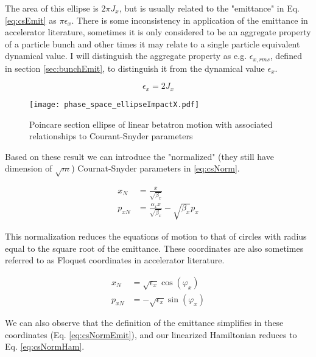 The area of this ellipse is $2\pi J_x$, but is usually related to the "emittance" in Eq. \ref{eq:csEmit} as $\pi \epsilon_x$. There is some inconsistency in application of the emittance in accelerator literature, sometimes it is only considered to be an aggregate property of a particle bunch and other times it may relate to a single particle equivalent dynamical value. I will distinguish the aggregate property as e.g. $\epsilon_{x,rms}$, defined in section \ref{sec:bunchEmit}, to distinguish it from the dynamical value $\epsilon_x$.

\begin{equation} \label{eq:csEmit}
	\epsilon_x = 2 J_x
\end{equation}

\begin{figure} \label{fig:csEllipse}
	\centering
	\texttt{[image: phase\_space\_ellipseImpactX.pdf]}
	\caption{Poincare section ellipse of linear betatron motion with associated relationships to Courant-Snyder parameters \cite{ImpactX}}
\end{figure}

Based on these result we can introduce the "normalized" (they still have dimension of $\sqrt{m}$) Cournat-Snyder parameters in \ref{eq:csNorm}.

\begin{equation} \label{eq:csNorm}
\begin{split}
	x_N &= \frac{x}{\sqrt{\beta_x}}\\
	p_{xN} &= \frac{\alpha_x x}{\sqrt{\beta_x}} - \sqrt{\beta_x}p_x
\end{split}
\end{equation}

This normalization reduces the equations of motion to that of circles with radius equal to the square root of the emittance. These coordinates are also sometimes referred to as Floquet coordinates in accelerator literature.

\begin{equation} \label{eq:csNormVarphi}
\begin{split}
	x_N &= \sqrt{\epsilon_x} \cos{(\varphi_x)}\\
	p_{xN} &= -\sqrt{\epsilon_x} \sin{(\varphi_x)}
\end{split}
\end{equation}

We can also observe that the definition of the emittance simplifies in these coordinates (Eq. \ref{eq:csNormEmit}), and our linearized Hamiltonian reduces to Eq. \ref{eq:csNormHam}.

